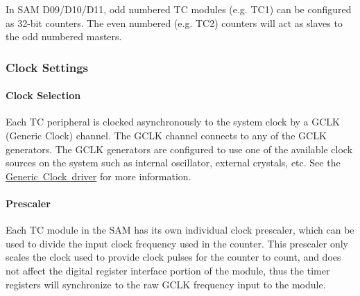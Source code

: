 In S\+AM D09/\+D10/\+D11, odd numbered TC modules (e.\+g. T\+C1) can be configured as 32-\/bit counters. The even numbered (e.\+g. T\+C2) counters will act as slaves to the odd numbered masters.\hypertarget{group__asfdoc__sam0__tc__group_asfdoc_sam0_tc_module_overview_clock}{}\subsubsection{Clock Settings}\label{group__asfdoc__sam0__tc__group_asfdoc_sam0_tc_module_overview_clock}
\hypertarget{group__asfdoc__sam0__tc__group_asfdoc_sam0_tc_module_overview_clock_selection}{}\paragraph{Clock Selection}\label{group__asfdoc__sam0__tc__group_asfdoc_sam0_tc_module_overview_clock_selection}
Each TC peripheral is clocked asynchronously to the system clock by a G\+C\+LK (Generic Clock) channel. The G\+C\+LK channel connects to any of the G\+C\+LK generators. The G\+C\+LK generators are configured to use one of the available clock sources on the system such as internal oscillator, external crystals, etc. See the \mbox{\hyperlink{group__asfdoc__sam0__system__clock__group}{Generic Clock driver}} for more information.\hypertarget{group__asfdoc__sam0__tc__group_asfdoc_sam0_tc_module_overview_clock_prescaler}{}\paragraph{Prescaler}\label{group__asfdoc__sam0__tc__group_asfdoc_sam0_tc_module_overview_clock_prescaler}
Each TC module in the S\+AM has its own individual clock prescaler, which can be used to divide the input clock frequency used in the counter. This prescaler only scales the clock used to provide clock pulses for the counter to count, and does not affect the digital register interface portion of the module, thus the timer registers will synchronize to the raw G\+C\+LK frequency input to the module.

